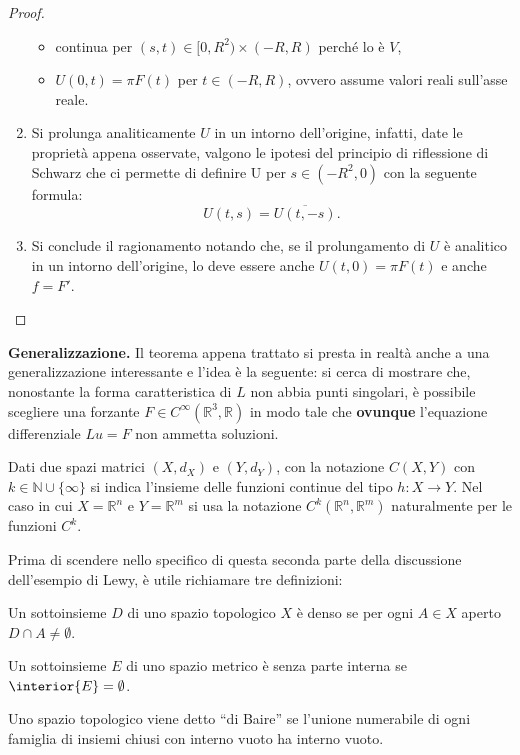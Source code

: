 \begin{example}
\begin{proof}
\begin{enumerate}[1.]
\begin{itemize}
\item
continua per $(s,t) \in [0,R^2) \times (-R,R)$ perché lo è $V$,
\item
$U(0,t)=\pi F(t)$ per $t\in (-R,R)$, ovvero assume valori reali sull'asse reale.
\end{itemize}
\item
Si prolunga analiticamente $U$ in un intorno dell'origine, infatti, 
date le proprietà appena osservate, valgono le ipotesi del principio di riflessione di Schwarz che ci permette 
di definire U per $s\in (-R^2,0)$ con la seguente formula: $$U(t,s)=\overline{U(t,-s)}.$$
\item
Si conclude il ragionamento notando che, se il prolungamento di $U$ è analitico in un intorno dell'origine, lo deve essere anche $U(t,0)=\pi F(t)$ e anche $f=F'$.
\end{enumerate}
\end{proof}

\textbf{Generalizzazione.} Il teorema appena trattato si presta in realtà anche a una generalizzazione interessante e l'idea è la seguente: si cerca di mostrare che, nonostante la forma caratteristica di $L$ non abbia punti singolari, è possibile scegliere una forzante $F \in C^{\infty} (\mathbb{R}^3, \mathbb{R})$ in modo tale che \textbf{ovunque} l'equazione differenziale $Lu=F$ non ammetta soluzioni.

\begin{remark}
Dati due spazi matrici $(X,d_X)$ e $(Y,d_Y)$, con la notazione $C(X,Y)$ con $k \in \mathbb{N} \cup \{\infty\}$ si indica l'insieme delle funzioni continue del tipo $h:X \rightarrow Y$. Nel caso in cui $X=\mathbb{R}^n$ e $Y=\mathbb{R}^m$ si usa la notazione $C^k(\mathbb{R}^n,\mathbb{R}^m)$ naturalmente per le funzioni $C^k$.
\end{remark}

Prima di scendere nello specifico di questa seconda parte della discussione dell'esempio di Lewy, è utile richiamare tre definizioni:
\begin{definition}
Un sottoinsieme $D$ di uno spazio topologico $X$ è denso se per ogni $ A \in X$ aperto $D \cap A \neq \emptyset $.
\end{definition}
\begin{definition}
Un sottoinsieme $E$ di uno spazio metrico è senza parte interna se $\interior{E}=\emptyset$.
\end{definition}
\begin{definition}
Uno spazio topologico viene detto ``di Baire'' se l'unione numerabile di ogni famiglia di insiemi chiusi con interno vuoto ha interno vuoto.
\end{definition}


\end{example}
